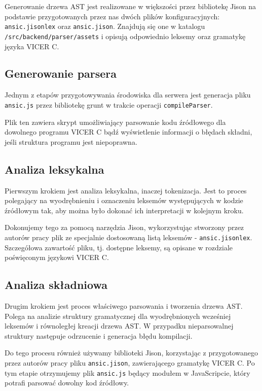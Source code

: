 \documentclass[a4paper,twoside,openright,11pt]{report}
\begin{document}
\par Generowanie drzewa AST jest realizowane w większości przez bibliotekę Jison na podstawie przygotowanych przez nas dwóch plików konfiguracyjnych: \texttt{ansic.jisonlex} oraz \texttt{ansic.jison}. Znajdują się one w katalogu \texttt{/src/backend/parser/assets} i opisują odpowiednio leksemy oraz gramatykę języka VICER C.

  \subsection {Generowanie parsera}
\par Jednym z etapów przygotowywania środowiska dla serwera jest generacja pliku \texttt{ansic.js} przez bibliotekę grunt w trakcie operacji \texttt{compileParser}.
\par Plik ten zawiera skrypt umożliwiający parsowanie kodu źródłowego dla dowolnego programu VICER C bądź wyświetlenie informacji o błędach składni, jeśli struktura programu jest niepoprawna. 

  \subsection {Analiza leksykalna}
\par Pierwszym krokiem jest analiza leksykalna, inaczej tokenizacja. Jest to proces polegający na wyodrębnieniu i oznaczeniu leksemów występujących w kodzie źródłowym tak, aby można było dokonać ich interpretacji w kolejnym kroku.
\par Dokonujemy tego za pomocą narzędzia Jison, wykorzystując stworzony przez autorów pracy plik ze specjalnie dostosowaną listą leksemów - \texttt{ansic.jisonlex}. Szczegółowa zawartość pliku, tj. dostępne leksemy, są opisane w rozdziale poświęconym językowi VICER C.

  \subsection {Analiza składniowa}
\par Drugim krokiem jest proces właściwego parsowania i tworzenia drzewa AST. Polega na analizie struktury gramatycznej dla wyodrębnionych wcześniej leksemów i równoległej kreacji drzewa AST. W przypadku nieparsowalnej struktury następuje odrzucenie i generacja błędu kompilacji. \cite{ansk} 
\par Do tego procesu również używamy biblioteki Jison, korzystając z przygotowanego przez autorów pracy pliku \texttt{ansic.jison}, zawierającego gramatykę VICER C. Po tym etapie otrzymujemy plik \texttt{ansic.js} będący modułem w JavaScripcie, który potrafi parsować dowolny kod źródłowy.
\end{document}
